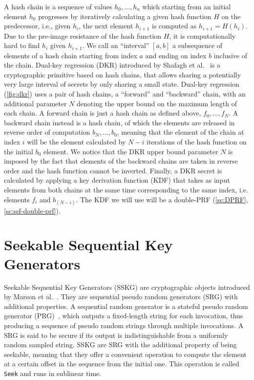 A hash chain is a sequence of values
$h_{0}, ..., h_{n}$ which starting from an initial
element $h_0$ progresses by iteratively calculating
a given hash function $H$ on the predecessor,
i.e., given $h_i$, the next element $h_{i+1}$ is computed as $h_{i+1} = H(h_i)$.
Due to the pre-image resistance of the hash function $H$, 
it is computationally hard to find $h_i$ given $h_{i+1}$.
We call an ``interval'' $[a, b]$ a subsequence of elements
of a hash chain starting from index $a$ and ending
on index $b$ inclusive of the chain.
Dual-key regression (DKR) introduced by Shafagh et al.~\cite{USENIX:SBRH20} is a
cryptographic primitive based on hash chains, that
allows sharing a potentially very large interval 
of secrets by only sharing a small state.
Dual-key regression (\cref{fig:dkr}) uses a pair of hash chains,
a ``forward'' and ``backward'' chain, with an additional
parameter $N$ denoting the
upper bound on the maximum length of each chain.
A forward chain is just a hash chain as defined
above, $f_{0}, ..., f_{N}$.
A backward chain instead is a hash chain, of which the
elements are released in reverse order of computation
$b_{N}, ..., b_{0}$, meaning that the element of the chain 
at index $i$ will be the element calculated by $N - i$
iterations of the hash function on the initial $b_{0}$
element. We notice that the DKR upper bound parameter
$N$ is imposed by the
fact that elements of the backward chains are taken in
reverse order and the hash function cannot be inverted.
Finally, a DKR secret is calculated by applying
a key derivation function (KDF) that takes
as input elements from both chains at the same
time corresponding to the same index, i.e.\!
elements $f_{i}$ and $b_{(N - i)}$.
The KDF we will use will be a double-PRF (\cref{sc:DPRF}, \cref{sc:ssf-double-prf}).


\section{Seekable Sequential Key Generators}\label{sc:SSKG}

Seekable Sequential Key Generators (SSKG) are cryptographic objects introduced by Marson et al.~\cite{ESORICS:MarPoe13}.
They are sequential pseudo random generators (SRG) with additional properties.
A sequential random generator is a stateful pseudo random generator (PRG)~\cite{cryptoeprint:2017/208}, 
which outputs a fixed-length string for each invocation, 
thus producing a sequence of pseudo random strings through multiple invocations.
A SRG is said to be secure if its output is indistinguishable from a uniformly random sampled string.
SSKG are SRG with the additional property of being seekable,
meaning that they offer a convenient operation to compute the
element at a certain offset in the sequence from the initial one.
This operation is called \texttt{Seek} and runs in sublinear time.

